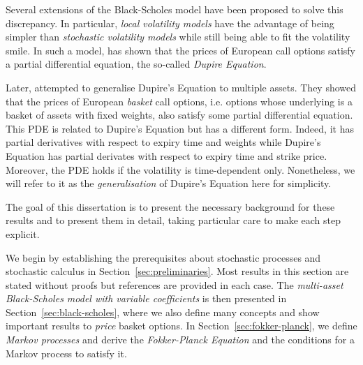 \documentclass[english]{article}
\newcommand{\comment}[1]{\color{blue}#1\color{black}}
\numberwithin{equation}{section}
\numberwithin{figure}{section}
\theoremstyle{bolddescit}
\theoremstyle{definition}
\theoremstyle{definition}
\theoremstyle{plain}
\theoremstyle{plain}
\theoremstyle{bolddesc}
\theoremstyle{plain}
\theoremstyle{remark}
\begin{document}
Several extensions of the Black-Scholes model have been proposed to solve this discrepancy. In particular, \textit{local volatility models} have the advantage of being simpler than \textit{stochastic volatility models} while still being able to fit the volatility smile. In such a model, \textcite{dupire_pricing_1993} has shown that the prices of European call options satisfy a partial differential equation, the so-called \textit{Dupire Equation}.

Later, \textcite{amster_towards_2009} attempted to generalise Dupire's Equation to multiple assets.
They showed that the prices of European \textit{basket} call options, i.e. options whose underlying is a basket of assets with fixed weights, also satisfy some partial differential equation. This PDE is related to Dupire's Equation but has a different form. Indeed, it has partial derivatives with respect to expiry time and weights while Dupire's Equation has partial derivates with respect to expiry time and strike price. Moreover, the PDE holds if the volatility is time-dependent only. Nonetheless, we will refer to it as the \textit{generalisation} of Dupire's Equation here for simplicity. %

The goal of this dissertation is to present the necessary background for these results and to present them in detail, taking particular care to make each step explicit.

We begin by establishing the prerequisites about stochastic processes and stochastic calculus in Section~\ref{sec:preliminaries}. Most results in this section are stated without proofs but references are provided in each case. The \textit{multi-asset Black-Scholes model with variable coefficients} is then presented in Section~\ref{sec:black-scholes}, where we also define many concepts and show important results to \textit{price} basket options. In Section~\ref{sec:fokker-planck}, we define \textit{Markov processes} and derive the \textit{Fokker-Planck Equation} and the conditions for a Markov process to satisfy it.
\end{document}
